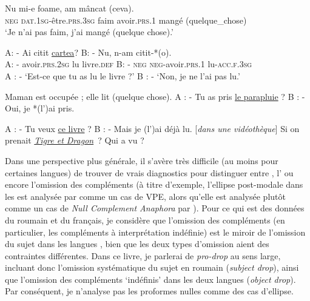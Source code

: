 \ea
\ea
\gll Nu  mi-e  foame,  am  mâncat  (ceva). \label{ch1:ex66a}\\
\textsc{neg} \textsc{dat.1sg}-être\textsc{.prs.3sg}  faim  avoir\textsc{.prs.1}  mangé  (quelque\_chose)\\
\glt ‘Je n'ai pas faim, j'ai mangé (quelque chose).’ 

\ex 
\gll  A: -  Ai  citit  \uline{cartea}? B: -  Nu,  n-am  citit-*(o). \label{ch1:ex66b}\\
A: - avoir.\textsc{prs.2sg}  lu  livre.\textsc{def} B: - \textsc{neg} \textsc{neg-}avoir.\textsc{prs.1}  lu-\textsc{acc.f.3sg}\\
\vspace*{-2\baselineskip}\glt A : - ‘Est-ce que tu as lu le livre ?’  B : - ‘Non, je ne l’ai pas lu.’
\z
\z

\ea
\ea  Maman est occupée ; elle lit (quelque chose). \label{ch1:ex67a}      
\ex  A : - Tu as pris \uline{le parapluie} ?  B : - Oui, je *(l’)ai pris. \label{ch1:ex67b}
\z
\z

\ea \label{ch1:ex68}
\ea  A : - Tu veux \uline{ce livre} ?  B : - Mais je (l’)ai déjà lu.
\ex{}  [\textit{dans une vidéothèque}] Si on prenait \uline{\textit{Tigre et Dragon}}~? Qui a vu ? \citep{CumminsEtAl2005} 
\z
\z

Dans une perspective plus générale, il s’avère très difficile (au moins pour certaines langues) de trouver de vrais diagnostics pour distinguer entre , l’ ou encore l’omission des compléments (à titre d’exemple, l’ellipse post-modale dans les  est analysée par \citealt{BusquetsEtAl2001} comme un cas de VPE, alors qu’elle est analysée plutôt comme un cas de \textit{Null Complement Anaphora} par \citealt{Depiante2001}). Pour ce qui est des données du roumain et du français, je considère que l’omission des compléments (en particulier, les compléments à interprétation indéfinie) est le miroir de l’omission du sujet dans les langues , bien que les deux types d’omission aient des contraintes différentes. Dans ce livre, je parlerai de \textit{pro-drop} au sens large, incluant donc l’omission systématique du sujet en roumain (\textit{subject drop}), ainsi que l’omission des compléments ‘indéfinis’ dans les deux langues (\textit{object drop}). Par conséquent, je n’analyse pas les proformes nulles comme des cas d’ellipse. 

